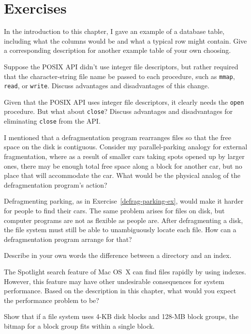 \section*{Exercises}
\begin{chapterEnumerate}
\item In the introduction to this chapter, I gave an example of a
database table, including what the columns would be and what a typical
row might contain.  Give a corresponding description for another
example table of your own choosing.
\item Suppose the POSIX API didn't use integer file descriptors, but
rather required that the character-string file name be passed to each
procedure, such as \verb|mmap|, \verb|read|, or \verb|write|.  Discuss
advantages and disadvantages of this
change.
\item Given that the POSIX API uses integer file descriptors, it
clearly needs the \verb|open| procedure.   But what about
\verb|close|?  Discuss advantages and
disadvantages for eliminating \verb|close| from the API.
\item\label{defrag-parking-ex}
I mentioned that a defragmentation program rearranges files so that
the free space on the disk is contiguous.  Consider my
parallel-parking analogy for external fragmentation, where as a result
of smaller cars taking spots opened up by larger ones, there may
be enough total free space along a block for another car, but no place
that will accommodate the car.  What would be the physical analog of
the defragmentation program's action?
\item
Defragmenting parking, as in Exercise~\ref{defrag-parking-ex}, would
make it harder for people to find their cars.  The same problem arises
for files on disk, but computer programs are not as flexible as people are.
After defragmenting a disk, the file system must still be able to
unambiguously locate each
file.  How can a defragmentation program arrange for that?
\item
Describe in your own words the difference between a directory and an
index.
\item
The Spotlight search feature of Mac OS~X can find files rapidly by
using indexes.  However, this feature may have other undesirable
consequences for system performance.  Based on the description in this
chapter, what would you expect the performance problem to be?
\item\label{block-group-bitmap-exercise}
Show that if a file system uses 4-KB disk blocks and 128-MB block
groups, the bitmap for a block group fits within a single block.

\end{chapterEnumerate}
